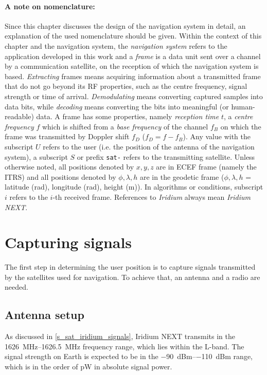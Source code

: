 \paragraph{A note on nomenclature:} Since this chapter discusses the design of the navigation system in detail, an explanation of the used nomenclature should be given. Within the context of this chapter and the navigation system, the \textit{navigation system} refers to the application developed in this work and a \textit{frame} is a data unit sent over a channel by a communication satellite, on the reception of which the navigation system is based. \textit{Extracting} frames means acquiring information about a transmitted frame that do not go beyond its RF properties, such as the centre frequency, signal strength or time of arrival. \textit{Demodulating} means converting captured samples into data bits, while \textit{decoding} means converting the bits into meaningful (or human-readable) data. A frame has some properties, namely \textit{reception time} $t$, a \textit{centre frequency} $f$ which is shifted from a \textit{base frequency} of the channel $f_B$ on which the frame was transmitted by Doppler shift $f_D$ ($f_D = f - f_B$). Any value with the subscript $U$ refers to the user (i.e. the position of the antenna of the navigation system), a subscript $S$ or prefix \texttt{sat-} refers to the transmitting satellite. Unless otherwise noted, all positions denoted by $x, y, z$ are in ECEF frame (namely the ITRS) and all positions denoted by $\phi, \lambda, h$ are in the geodetic frame ($\phi, \lambda, h$ = latitude (rad), longitude (rad), height (m)). In algorithms or conditions, subscript $i$ refers to the $i$-th received frame. References to \textit{Iridium} always mean \textit{Iridium NEXT}.


\section{Capturing signals}
The first step in determining the user position is to capture signals transmitted by the satellites used for navigation. To achieve that, an antenna and a radio are needed.

\subsection{Antenna setup}
As discussed in \autoref{s_sat_iridium_signals}, Iridium NEXT transmits in the \qtyrange{1626}{1626.5}{\MHz} frequency range, which lies within the L-band. The signal strength on Earth is expected to be in the \qtyrange{-90}{-110}{dBm} range\cite{sop01}, which is in the order of \unit{pW} in absolute signal power.


